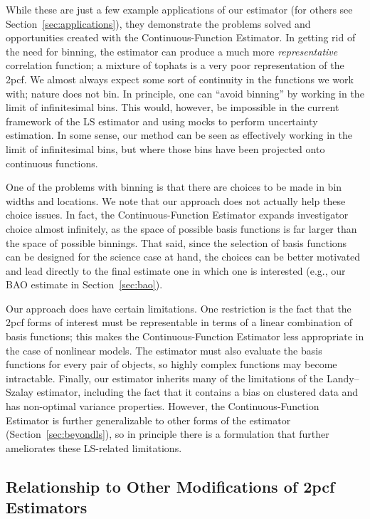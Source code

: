 \documentclass[modern]{aastex62}
\newcommand{\cf}{2pcf\xspace} %
\newcommand{\est}{the Continuous-Function Estimator\xspace}
\newcommand{\LS}{LS\xspace}
\begin{document}
While these are just a few example applications of our estimator (for others see Section~\ref{sec:applications}), they demonstrate the problems solved and opportunities created with \est.
In getting rid of the need for binning, the estimator can produce a much more \textit{representative} correlation function; a mixture of tophats is a very poor representation of the \cf. 
We almost always expect some sort of continuity in the functions we work with; nature does not bin.
In principle, one can ``avoid binning'' by working in the limit of infinitesimal bins.
This would, however, be impossible in the current framework of the \LS estimator and using mocks to perform uncertainty estimation.
In some sense, our method can be seen as effectively working in the limit of infinitesimal bins, but where those bins have been projected onto continuous functions.

One of the problems with binning is that there are choices to be made in bin widths and locations.
We note that our approach does not actually help these choice issues.
In fact, \est expands investigator choice almost infinitely, as the space of possible basis functions is far larger than the space of possible binnings.
That said, since the selection of basis functions can be designed for the science case at hand, the choices can be better motivated and lead directly to the final estimate one in which one is interested (e.g., our BAO estimate in Section~\ref{sec:bao}).  

Our approach does have certain limitations.
One restriction is the fact that the \cf forms of interest must be representable in terms of a linear combination of basis functions; this makes \est less appropriate in the case of nonlinear models.
The estimator must also evaluate the basis functions for every pair of objects, so highly complex functions may become intractable.
Finally, our estimator inherits many of the limitations of the Landy--Szalay estimator, including the fact that it contains a bias on clustered data and has non-optimal variance properties.
However, \est is further generalizable to other forms of the estimator (Section~\ref{sec:beyondls}), so in principle there is a formulation that further ameliorates these \LS-related limitations.

\subsection{Relationship to Other Modifications of \cf Estimators}
\label{sec:otherest}
\end{document}
